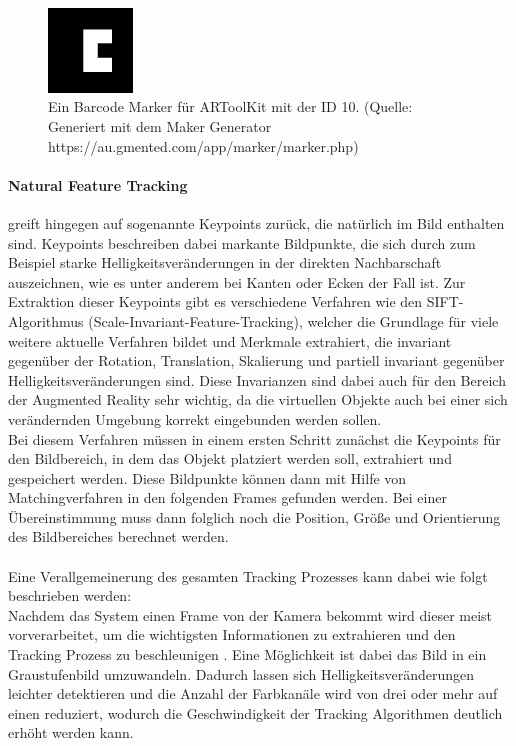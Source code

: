 \begin{figure}[h!]
\centering
\includegraphics[width=0.2\textwidth]{Abbildungen/BarcodeMarker3x3-10.png}
\caption[Barcode Marker]{Ein Barcode Marker für ARToolKit mit der ID 10. (Quelle: Generiert mit dem  Maker Generator https://au.gmented.com/app/marker/marker.php)}
\label{fig:barcode-marker}
\end{figure}


\paragraph{Natural Feature Tracking} greift hingegen auf sogenannte Keypoints zurück, die natürlich im Bild enthalten sind. Keypoints beschreiben dabei markante Bildpunkte, die sich durch zum Beispiel starke Helligkeitsveränderungen in der direkten Nachbarschaft auszeichnen, wie es unter anderem bei Kanten oder Ecken der Fall ist. Zur Extraktion dieser Keypoints gibt es verschiedene Verfahren wie den SIFT-Algorithmus (Scale-Invariant-Feature-Tracking),  welcher die Grundlage für viele weitere aktuelle Verfahren bildet und Merkmale extrahiert, die invariant gegenüber der Rotation, Translation, Skalierung und partiell invariant gegenüber Helligkeitsveränderungen sind\citep[S. 345]{nischwitz:bildverarbeitung}. Diese Invarianzen sind dabei auch für den Bereich der Augmented Reality sehr wichtig, da die virtuellen Objekte auch bei einer sich verändernden Umgebung korrekt eingebunden werden sollen.\\
Bei diesem Verfahren müssen in einem ersten Schritt zunächst die Keypoints für den Bildbereich, in dem das Objekt platziert werden soll, extrahiert und gespeichert werden. Diese Bildpunkte können dann mit Hilfe von Matchingverfahren in den folgenden Frames gefunden werden. Bei einer Übereinstimmung muss dann folglich noch die Position, Größe und Orientierung des Bildbereiches berechnet werden. \\
\\
Eine Verallgemeinerung des gesamten Tracking Prozesses kann dabei wie folgt beschrieben werden:\\
Nachdem das System einen Frame von der Kamera bekommt wird dieser meist vorverarbeitet, um die wichtigsten Informationen zu extrahieren und den Tracking Prozess zu beschleunigen \citep[S. 5]{cukovic:marker-vs-natural}. Eine Möglichkeit ist dabei das Bild in ein Graustufenbild umzuwandeln. Dadurch lassen sich Helligkeitsveränderungen leichter detektieren und die Anzahl der Farbkanäle wird von drei oder mehr auf einen reduziert, wodurch die Geschwindigkeit der Tracking Algorithmen deutlich erhöht werden kann.\\
